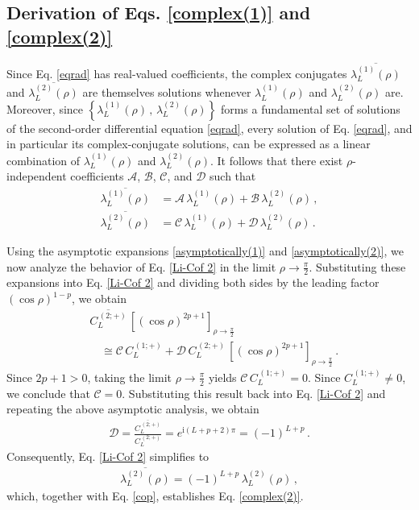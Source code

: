 \documentclass[aps,twocolumn,nofootinbib]{revtex4}
\begin{document}
{\begin{appendix}
\subsection{Derivation of Eqs. \eqref{complex(1)} and \eqref{complex(2)}}\label{complex-con-sol}

Since Eq. \eqref{eqrad} has real-valued coefficients, the complex conjugates $\overline{\lambda^{(1)}_L(\rho)}$ and $\overline{\lambda^{(2)}_L(\rho)}$ are themselves solutions whenever $\lambda^{(1)}_L(\rho)$ and $\lambda^{(2)}_L(\rho)$ are. Moreover, since $\left\{ \lambda^{(1)}_L(\rho) \,,\, \lambda^{(2)}_L(\rho) \right\}$ forms a fundamental set of solutions of the second-order differential equation \eqref{eqrad}, every solution of Eq. \eqref{eqrad}, and in particular its complex-conjugate solutions, can be expressed as a linear combination of $\lambda^{(1)}_L(\rho)$ and $\lambda^{(2)}_L(\rho)$. It follows that there exist $\rho$-independent coefficients $\mathcal{A}$, $\mathcal{B}$, $\mathcal{C}$, and $\mathcal{D}$ such that
\begin{align}
    \overline{\lambda^{(1)}_L(\rho)} &= \mathcal{A}\,\lambda^{(1)}_L(\rho) + \mathcal{B}\,\lambda^{(2)}_L(\rho)\,,\label{Li-Cof 1}\\[3pt]
    \overline{\lambda^{(2)}_L(\rho)} &= \mathcal{C}\,\lambda^{(1)}_L(\rho) + \mathcal{D}\,\lambda^{(2)}_L(\rho) \label{Li-Cof 2}\,.
\end{align}

Using the asymptotic expansions \eqref{asymptotically(1)} and \eqref{asymptotically(2)}, we now analyze the behavior of Eq. \eqref{Li-Cof 2} in the limit $\rho\longrightarrow \frac{\pi}{2}$. Substituting these expansions into Eq. \eqref{Li-Cof 2} and dividing both sides by the leading factor $(\cos\rho)^{1-p}$, we obtain
\begin{align}
    &\overline{C_L^{\,(2;+)}}\, \left[(\cos\rho)^{2p+1}\right]_{\rho\longrightarrow \frac{\pi}{2}} \nonumber\\[3pt]
    &\quad\cong \mathcal{C}\, C_L^{\,(1;+)} + \mathcal{D}\, C_L^{\,(2;+)}\, \left[(\cos\rho)^{2p+1}\right]_{\rho\longrightarrow \frac{\pi}{2}}\,.
\end{align}
Since $2p+1>0$, taking the limit $\rho\longrightarrow \tfrac{\pi}{2}$ yields $\mathcal{C}\, C_L^{\,(1;+)}=0$. Since $C_L^{\,(1;+)}\neq 0$, we conclude that $\mathcal{C}=0$. Substituting this result back into Eq. \eqref{Li-Cof 2} and repeating the above asymptotic analysis, we obtain
\begin{align}\label{miriam1}
    \mathcal{D} = \frac{\overline{C_L^{\,(2;+)}}}{C_L^{\,(2;+)}} = e^{\mathrm{i}(L+p+2)\pi} = (-1)^{L+p}\,.
\end{align}
Consequently, Eq. \eqref{Li-Cof 2} simplifies to
\begin{align}\label{te-ra-be}
     \overline{\lambda^{(2)}_L(\rho)} = (-1)^{L+p}\, \lambda^{(2)}_L(\rho)\,,
\end{align}
which, together with Eq. \eqref{cop}, establishes Eq. \eqref{complex(2)}.


\end{appendix}}
\end{document}
